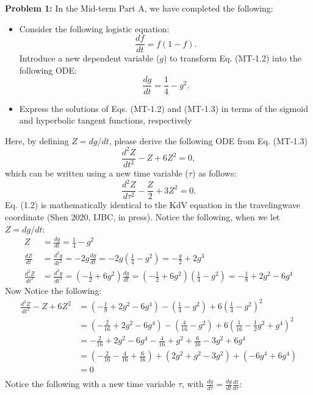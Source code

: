 \documentclass[11pt]{article}
\newenvironment{problem}[1]{\textbf{Problem #1: }}{\newpage}
\begin{document}
	\begin{problem}{1}
		In the Mid-term Part A, we have completed the following:
		\begin{itemize}[label = (*)]
			\item Consider the following logistic equation: 
			\[\frac{df}{dt} = f(1-f). \tag{MT - 1.2}\]
			Introduce a new dependent variable ($g$) to transform Eq. (MT-1.2) into
			the following ODE:
			\[\frac{dg}{dt} = \frac{1}{4} - g^2. \tag{MT - 1.3}\]
			\item Express the solutions of Eqs. (MT-1.2) and (MT-1.3) in terms of the
			sigmoid and hyperbolic tangent functions, respectively
		\end{itemize}
		Here, by defining $Z = dg/dt$, please derive the following ODE from Eq. (MT-1.3)
		\[\frac{d^2 Z}{dt^2} - Z + 6Z^2 = 0, \tag{1.1}\]
		which can be written using a new time variable ($\tau$) as follows:
		\[\frac{d^2 Z}{d\tau^2} - \frac{Z}{2} + 3Z^2 = 0. \tag{1.2}\]
		Eq. (1.2) is mathematically identical to the KdV equation in the travelingwave coordinate (Shen 2020, IJBC, in press).
		\newpage
		Notice the following, when we let $Z = dg/dt$:
		\begin{align*}
			Z &= \frac{dg}{dt} = \frac{1}{4} - g^2 \\
			\frac{dZ}{dt} &= \frac{d^2 g}{dt^2} = -2g\frac{dg}{dt} = -2g\left(\frac{1}{4} - g^2 \right) = -\frac{g}{2} + 2g^3 \\
			\frac{d^2Z}{dt^2} &= \frac{d^3 g}{dt^3} = \left(-\frac{1}{2} + 6g^2\right)\frac{dg}{dt} = \left(-\frac{1}{2} + 6g^2\right)\left(\frac{1}{4} - g^2 \right) = -\frac{1}{8} + 2g^2 - 6g^4
		\end{align*}
		Now Notice the following:
		\begin{align*}
			\frac{d^2 Z}{dt^2} - Z + 6Z^2 &= \left(-\frac{1}{8} + 2g^2 - 6g^4\right) - \left(\frac{1}{4} - g^2\right) + 6\left(\frac{1}{4} - g^2\right)^2 \\
			&= \left(-\frac{2}{16} + 2g^2 - 6g^4\right) - \left(\frac{4}{16} - g^2\right) + 6\left(\frac{1}{16} - \frac{1}{2}g^2 + g^4\right)^2 \\
			&= -\frac{2}{16} + 2g^2 - 6g^4 - \frac{4}{16} + g^2 + \frac{6}{16} - 3g^2 + 6g^4 \\
			&= \left(-\frac{2}{16} - \frac{4}{16} + \frac{6}{16} \right) + \left(2g^2 + g^2 - 3g^2\right) + (-6g^4 + 6g^4) \\
			&= 0 \\
		\end{align*}
		Notice the following with a new time variable $\tau$, with $\frac{dg}{d\tau} = \frac{dg}{dt}\frac{dt}{d\tau}$:

\end{problem}
\end{document}
